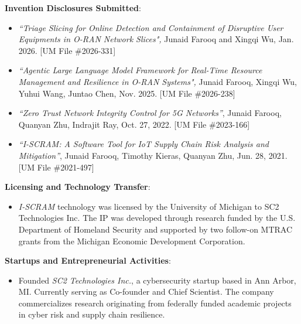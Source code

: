\documentclass[letterpaper,11pt]{article}
\newcommand{\resumeItem}[2]{
  \item\small{
    \textbf{#1}{: #2 \vspace{-2pt}}
  }
}
\begin{document}
    \resumeItem{Invention Disclosures Submitted}{}
    \justifying
    \begin{itemize}
        \item \emph{``Triage Slicing for Online Detection and Containment of Disruptive User Equipments in O-RAN Network Slices",} Junaid Farooq and Xingqi Wu, Jan. 2026. [UM File \#2026-331]
        \item \emph{``Agentic Large Language Model Framework for Real-Time Resource Management and Resilience in O-RAN Systems",} Junaid Farooq, Xingqi Wu, Yuhui Wang, Juntao Chen, Nov. 2025. [UM File \#2026-238]
        \item \emph{``Zero Trust Network Integrity Control for 5G Networks''}, Junaid Farooq, Quanyan Zhu, Indrajit Ray, Oct. 27, 2022. [UM File \#2023-166]
        \item \emph{``I-SCRAM: A Software Tool for IoT Supply Chain Risk Analysis and Mitigation''}, Junaid Farooq, Timothy Kieras, Quanyan Zhu, Jun. 28, 2021. [UM File \#2021-497]
    \end{itemize}
    \resumeItem{Licensing and Technology Transfer}{}
    \justifying
    \begin{itemize}
        \item \emph{I-SCRAM} technology was licensed by the University of Michigan to SC2 Technologies Inc. The IP was developed through research funded by the U.S. Department of Homeland Security and supported by two follow-on MTRAC grants from the Michigan Economic Development Corporation.
    \end{itemize}
    \resumeItem{Startups and Entrepreneurial Activities}{}
    \justifying
    \begin{itemize}
        \item Founded \emph{SC2 Technologies Inc.}, a cybersecurity startup based in Ann Arbor, MI. Currently serving as Co-founder and Chief Scientist. The company commercializes research originating from federally funded academic projects in cyber risk and supply chain resilience.
    \end{itemize}
\end{document}
